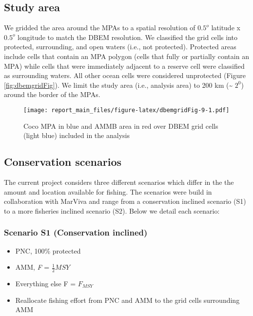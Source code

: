 \documentclass[
]{article}
\providecommand{\tightlist}{%
  \setlength{\itemsep}{0pt}\setlength{\parskip}{0pt}}
\begin{document}
\hypertarget{study-area-1}{%
\subsection{Study area}\label{study-area-1}}

We gridded the area around the MPAs to a spatial resolution of \(0.5^o\) latitude x \(0.5^o\) longitude to match the DBEM resolution. We classified the grid cells into protected, surrounding, and open waters (i.e., not protected). Protected areas include cells that contain an MPA polygon (cells that fully or partially contain an MPA) while cells that were immediately adjacent to a reserve cell were classified as surrounding waters. All other ocean cells were considered unprotected (Figure \ref{fig:dbemgridFig}). We limit the study area (i.e., analysis area) to 200 km (\textasciitilde{} \(2^0\)) around the border of the MPAs.

\begin{figure}
\centering
\texttt{[image: report\_main\_files/figure-latex/dbemgridFig-9-1.pdf]}
\caption{\label{fig:dbemgridFig-9}Coco MPA in blue and AMMB area in red over DBEM grid cells (light blue) included in the analysis}
\end{figure}

\hypertarget{conservation-scenarios-1}{%
\subsection{Conservation scenarios}\label{conservation-scenarios-1}}

The current project considers three different scenarios which differ in the the amount and location available for fishing. The scenarios were build in collaboration with MarViva and range from a conservation inclined scenario (S1) to a more fisheries inclined scenario (S2). Below we detail each scenario:

\hypertarget{scenario-s1-conservation-inclined-1}{%
\subsubsection{Scenario S1 (Conservation inclined)}\label{scenario-s1-conservation-inclined-1}}

\begin{itemize}
\tightlist
\item
  PNC, 100\% protected
\item
  AMM, \emph{F} = \(\frac{1}{2}MSY\)
\item
  Everything else F = \(F_{MSY}\)
\item
  Reallocate fishing effort from PNC and AMM to the grid cells surrounding AMM
\end{itemize}
\end{document}
